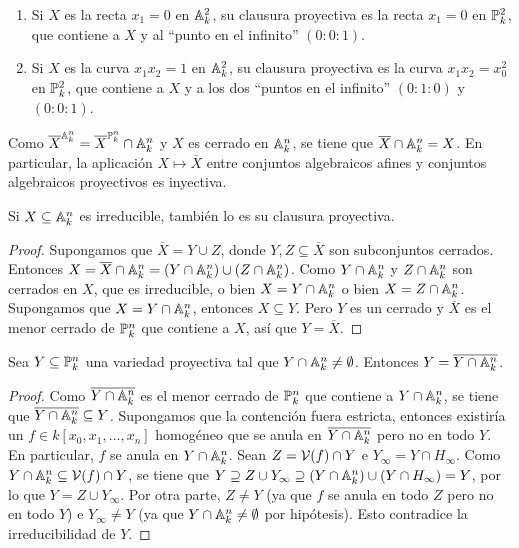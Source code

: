 \documentclass[ACGA.tex]{subfiles}
\begin{document}
\begin{ejs}
 \begin{enumerate}
       \item  Si $X$ es la recta $x_1=0$ en $\mathbb{A}^2_k$, su clausura proyectiva es la recta $x_1=0$ en $\mathbb{P}^2_k$, que contiene a $X$ y al ``punto en el infinito'' $(0:0:1)$.
\item Si $X$ es la curva $x_1x_2=1$ en $\mathbb{A}^2_k$, su clausura proyectiva es la curva $x_1x_2=x_0^2$ en $\mathbb{P}^2_k$, que contiene a $X$ y a los dos ``puntos en el infinito'' $(0:1:0)$ y $(0:0:1)$.
       \end{enumerate}

\end{ejs}

 
Como ${\overline X}^{\mathbb{A}^n_k}={\overline X}^{\mathbb{P}^n_k}\cap \mathbb{A}^n_k$ y $X$ es cerrado en $\mathbb{A}^n_k$, se tiene que ${\overline X}\cap\mathbb{A}^n_k=X$. En particular, la aplicación $X\mapsto\overline X$ entre conjuntos algebraicos afines y conjuntos algebraicos proyectivos es inyectiva.

\begin{lemma} Si $X\subseteq\mathbb{A}^n_k$ es irreducible, también lo es su clausura proyectiva.
 \end{lemma}

\begin{proof}
 Supongamos que $\overline X=Y\cup Z$, donde $Y,Z\subseteq\overline X$ son subconjuntos cerrados. Entonces $X={\overline X}\cap\mathbb{A}^n_k=(Y\cap\mathbb{A}^n_k)\cup(Z\cap\mathbb{A}^n_k)$. Como $Y\cap\mathbb{A}^n_k$ y $Z\cap\mathbb{A}^n_k$ son cerrados en $X$, que es irreducible, o bien $X=Y\cap\mathbb{A}^n_k$ o bien $X=Z\cap\mathbb{A}^n_k$. Supongamos que $X=Y\cap\mathbb{A}^n_k$, entonces $X\subseteq Y$. Pero $Y$ es un cerrado y $\overline X$ es el menor cerrado de $\mathbb{P}^n_k$ que contiene a $X$, así que $Y=\overline X$.
\end{proof}


\begin{prop}
 Sea $Y\subseteq\mathbb{P}^n_k$ una variedad proyectiva tal que $Y\cap \mathbb{A}^n_k\neq\emptyset$. Entonces $Y=\overline{Y\cap\mathbb{A}^n_k}$.
\end{prop}

\begin{proof}
 Como $\overline{Y\cap\mathbb{A}^n_k}$ es el menor cerrado de $\mathbb{P}^n_k$ que contiene a $Y\cap\mathbb{A}^n_k$, se tiene que $\overline{Y\cap\mathbb{A}^n_k}\subseteq Y$. Supongamos que la contención fuera estricta, entonces existiría un $f\in k[x_0,x_1,\ldots,x_n]$ homogéneo que se anula en $\overline{Y\cap\mathbb{A}^n_k}$ pero no en todo $Y$. En particular, $f$ se anula en $Y\cap\mathbb{A}^n_k$. Sean $Z=\mathcal{V}(f)\cap Y$ e $Y_\infty=Y\cap H_\infty$. Como $Y\cap\mathbb{A}^n_k\subseteq\mathcal{V}(f)\cap Y$, se tiene que $Y\supseteq Z\cup Y_\infty\supseteq (Y\cap\mathbb{A}^n_k)\cup(Y\cap H_\infty)=Y$, por lo que $Y=Z\cup Y_\infty$. Por otra parte, $Z\neq Y$ (ya que $f$ se anula en todo $Z$ pero no en todo $Y$) e $Y_\infty\neq Y$ (ya que $Y\cap\mathbb{A}^n_k\neq\emptyset$ por hipótesis). Esto contradice la irreducibilidad de $Y$. 
\end{proof}
\end{document}
